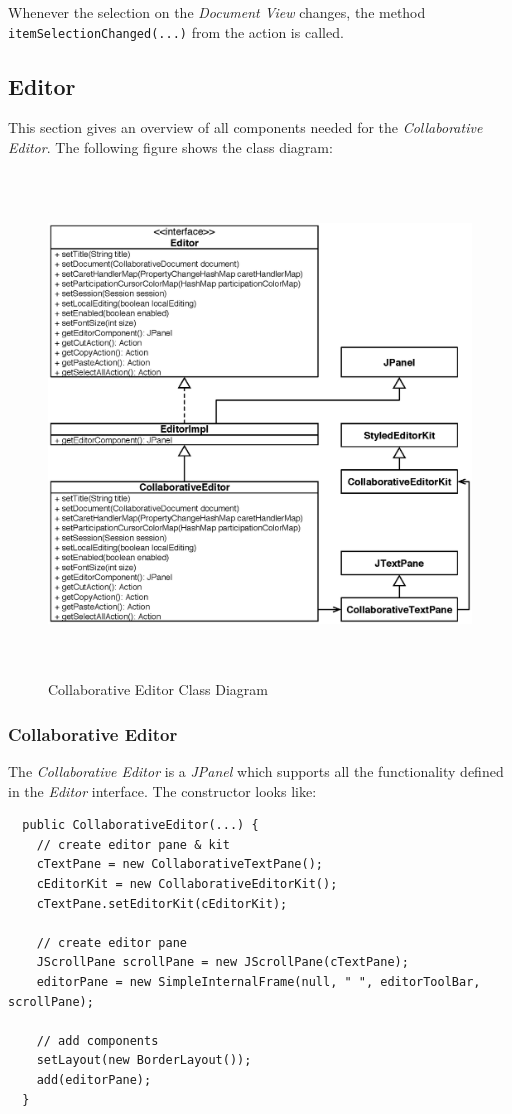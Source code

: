 Whenever the selection on the \textit{Document View} changes, the method \texttt{itemSelectionChanged(...)} from the action is called.



\subsection{Editor}
This section gives an overview of all components needed for the \textit{Collaborative Editor}. The following figure shows the class diagram:
\begin{figure}[H]
\begin{center}
  \includegraphics[height=5.25in, width=5.55in]{../images/finalreport/application_editor.eps}
\caption{Collaborative Editor Class Diagram}
\label{application_editor}
\end{center}
\end{figure}

\subsubsection{Collaborative Editor}
The \textit{Collaborative Editor} is a \emph{JPanel} which supports all the functionality defined in the \textit{Editor} interface. The constructor looks like:
\begin{verbatim}
  public CollaborativeEditor(...) {
    // create editor pane & kit
    cTextPane = new CollaborativeTextPane();
    cEditorKit = new CollaborativeEditorKit();
    cTextPane.setEditorKit(cEditorKit);

    // create editor pane
    JScrollPane scrollPane = new JScrollPane(cTextPane);
    editorPane = new SimpleInternalFrame(null, " ", editorToolBar, scrollPane);

    // add components		
    setLayout(new BorderLayout());
    add(editorPane);    
  }
\end{verbatim}

